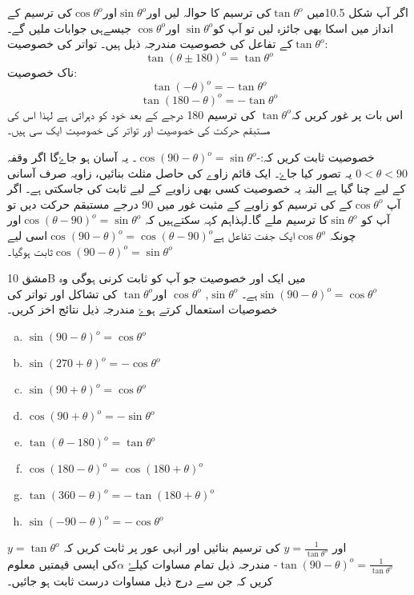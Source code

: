 اگر آپ شکل 10.5میں \(\tan \theta^o\)کی ترسیم کا حوالہ لیں اور\(\sin \theta^o\)اور\(\cos \theta^o\)کی ترسیم کے انداز میں اسکا بھی جائزہ لیں تو آپ کو\(\sin \theta^o\) اور\(\cos \theta^o\) جیسےہی جوابات ملیں گے۔
\(\tan \theta^o\)کے تفاعل کی خصوصیت مندرجہ ذیل ہیں۔
تواتر کی خصوصیت:   \begin{equation*}
\tan (\theta \pm 180)^o=\tan \theta^o
\end{equation*} 
ناک خصوصیت: 
 \begin{equation*}
 \tan (-\theta)^o=-\tan \theta^o 
\end{equation*}
 \begin{equation*}
 \tan (180 -\theta)^o=-\tan \theta^o
\end{equation*}
اس بات پر غور کریں کہ\(\tan \theta^o\) کی ترسیم 180 درجے کے بعد خود کو دہراتی ہے لہذا اس کی مستبقم حرکت کی  خصوصیت اور تواتر کی خصوصیت ایک سی ہیں۔

خصوصیت ثابت کریں کہ:-\( \cos (90- \theta)^o=\sin \theta^o\)۔
یہ آسان ہو جاۓگا اگر وقفہ\(0<\theta <90\) یہ تصور کیا جاۓ۔ ایک قائم زاوے کی حاصل مثلث بنائیں، زاویہ صرف آسانی کے لیے چنا گیا ہے البتہ یہ خصوصیت کسی بھی زاویے کے لیے ثابت کی جاسکتی ہے۔
اگر آپ \(\cos \theta^o\)کے کی ترسیم کو زاویے کے مثبت غور میں 90 درجے مستبقم حرکت دیں تو آپ کو \(\sin \theta^o\)کا ترسیم ملے گا۔لہذاہم کہہ سکتےہیں کہ \( \cos (\theta-90)^o=\sin \theta^o\)اور چونکہ \(\cos \theta^o\)ایک جفت تفاعل ہے\(\cos (90- \theta)^o=\cos (\theta-90)^o\)اسی لیے \(\cos (90- \theta)^o=\sin \theta^o\)ثابت ہوگیا۔

مشق 10B میں ایک اور خصوصیت جو آپ کو ثابت کرنی ہوگی وہ \(\sin (90- \theta)^o=\cos \theta^o\)ہے۔
\(\sin \theta^o\), \(\cos \theta^o\) اور\(\tan \theta^o\) کی تشاکل اور تواتر کی خصوصیات استعمال کرتے ہوۓ مندرجہ ذیل نتائج اخز کریں۔
\begin{multicols}{2}
\begin{enumerate}[a.]
\item \(\sin (90 -\theta)^o =\cos \theta^o\)
\item \(\sin (270 +\theta)^o =-\cos \theta^o\)
\item \(\sin (90 +\theta)^o =\cos \theta^o\)
\item \(\cos (90 +\theta)^o =-\sin \theta^o\)
\item \(\tan (\theta-180)^o =\tan \theta^o\)
\item \(\cos (180 -\theta)^o =\cos (180+ \theta)^o\)
\item \(\tan (360 -\theta)^o =-\tan (180+ \theta)^o\)
\item \(\sin (-90 -\theta)^o =-\cos \theta^o\)
\end{enumerate}
\end{multicols}
\(y= \tan \theta^o\)
اور \(y=\frac{1}{\tan \theta^o}\) کی ترسیم بنائیں اور انہی عور پر ثابت کریں کہ\(\tan (90 -\theta)^o=\frac{1}{\tan \theta^o}\)-
مندرجہ ذیل تمام مساوات کیلۓ \(\alpha\)کی ایسی قیمتیں معلوم کریں کہ جن سے درج ذیل مساوات درست ثابت ہو جائیں۔


